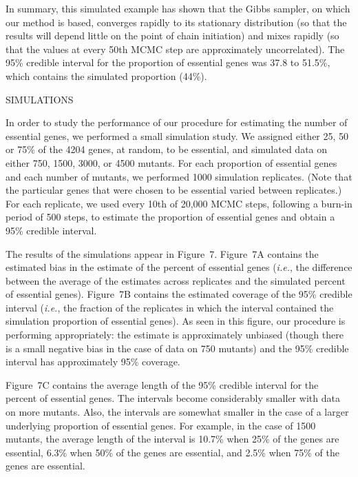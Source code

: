 \documentclass[letterpaper]{article}
\begin{document}
\begin{multicols}{2}
In summary, this simulated example has shown that the Gibbs sampler,
on which our method is based, converges rapidly to its stationary
distribution (so that the results will depend little on the point of
chain initiation) and mixes rapidly (so that the values at every 50th
MCMC step are approximately uncorrelated).  The 95\% credible interval
for the proportion of essential genes was 37.8 to 51.5\%, which
contains the simulated proportion (44\%).


\smallskip \bigskip
\centerline{SIMULATIONS}
\smallskip

In order to study the performance of our procedure for estimating the
number of essential genes, we performed a small simulation study.
We assigned either 25, 50 or 75\% of the 4204 genes, at random, to be
essential, and simulated data on either 750, 1500, 3000, or 4500
mutants.  For each proportion of essential genes and each number of
mutants, we performed 1000 simulation replicates.  (Note that the
particular genes that were chosen to be essential varied between
replicates.)  For each replicate, we used every 10th of 20,000 MCMC
steps, following a burn-in period of 500 steps, to estimate the
proportion of essential genes and obtain a 95\% credible interval.

The results of the simulations appear in Figure~7.  Figure~7A contains
the estimated bias in the estimate of the percent of essential genes
(\emph{i.e.}, the difference between the average of the estimates
across replicates and the simulated percent of essential genes).
Figure~7B contains the estimated coverage of the 95\% credible
interval (\emph{i.e.}, the fraction of the replicates in which the
interval contained the simulation proportion of essential genes).  As
seen in this figure, our procedure is performing appropriately: the
estimate is approximately unbiased (though there is a small negative
bias in the case of data on 750 mutants) and the 95\% credible
interval has approximately 95\% coverage.

Figure~7C contains the average length of the 95\% credible interval
for the percent of essential genes.  The intervals become considerably
smaller with data on more mutants.  Also, the intervals are somewhat
smaller in the case of a larger underlying proportion of essential
genes.  For example, in the case of 1500 mutants, the average length
of the interval is 10.7\% when 25\% of the genes are essential, 
6.3\% when 50\% of the genes are essential, and 2.5\% when 75\% of the
genes are essential.


\end{multicols}
\end{document}
